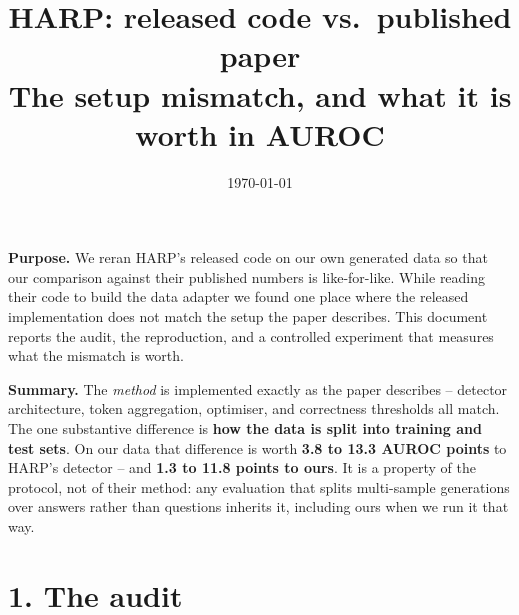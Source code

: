 \documentclass[11pt,a4paper]{article}
\title{HARP: released code vs.\ published paper\\[2pt]
\large The setup mismatch, and what it is worth in AUROC}
\author{}
\date{\today}
\begin{document}
\maketitle

\noindent\textbf{Purpose.} We reran HARP's released code on our own generated data so that our
comparison against their published numbers is like-for-like. While reading their code to build the
data adapter we found one place where the released implementation does not match the setup the paper
describes. This document reports the audit, the reproduction, and a controlled experiment that
measures what the mismatch is worth.

\medskip
\noindent\textbf{Summary.} The \emph{method} is implemented exactly as the paper describes --
detector architecture, token aggregation, optimiser, and correctness thresholds all match. The one
substantive difference is \textbf{how the data is split into training and test sets}. On our data
that difference is worth \textbf{3.8 to 13.3 AUROC points} to HARP's detector -- and
\textbf{1.3 to 11.8 points to ours}. It is a property of the protocol, not of their method: any
evaluation that splits multi-sample generations over answers rather than questions inherits it,
including ours when we run it that way.

\section*{1. The audit}
\end{document}
